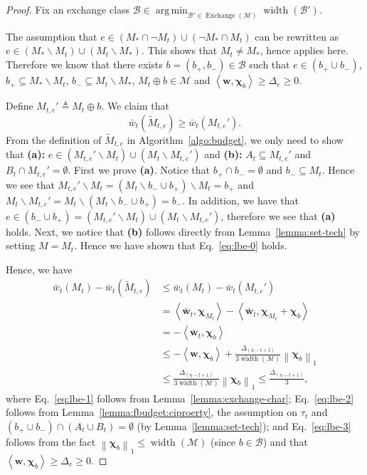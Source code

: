 \documentclass{article}
\newcommand{\M}{\mathcal M}
\newcommand{\B}{\mathcal B}
\newcommand{\del}{\backslash}
\DeclareMathOperator{\rank}{width}
\DeclareMathOperator*{\argmin}{arg\,min}
\DeclareMathOperator{\Exchange}{Exchange}
\newcommand{\inn}[1]{\left\langle #1 \right\rangle}
\newcommand{\nor}[1]{\left\|#1\right\|}
\renewcommand{\vec}[1]{\boldsymbol{#1}}
\begin{document}
\begin{proof}
Fix an exchange class $\B\in \argmin_{\B'\in \Exchange(\M)} \rank(\B')$.

The assumption that $e\in (M_*\cap \neg M_t) \cup (\neg M_* \cap M_t)$ can be rewritten as 
$e \in (M_* \del M_t) \cup (M_t\del M_*)$.
This shows that $M_t\not=M_*$,
hence  applies here. 
Therefore we know that there exists $b=(b_+,b_-)\in \B$ such that
$e\in (b_+\cup b_-)$, $b_+\subseteq M_* \del M_t$, $b_- \subseteq M_t \del M_*$, $M_t \oplus b \in \M$ and $\inn{\vec w,\vec\chi_b}\ge \Delta_e \ge 0$.

Define $M_{t,e}' \triangleq M_t \oplus b$.
We claim that
\begin{equation}
\label{eq:lbe-0}
\bar w_t(\tilde M_{t,e}) \ge \bar w_t(M_{t,e}').
\end{equation}
From the definition of $\tilde M_{t,e}$ in Algorithm~\ref{algo:budget}, we only need to show that \textbf{(a):} $e\in (M_{t,e}' \del M_t) \cup (M_t \del M_{t,e}')$ and \textbf{(b):} $A_t \subseteq M_{t,e}'$ and $B_t \cap M_{t,e}' = \emptyset$.
First we prove \textbf{(a)}. Notice that $b_+\cap b_- = \emptyset$ and $b_- \subseteq M_t$. 
Hence we see that $M_{t,e}' \del M_t = (M_t\del b_-\cup b_+) \del M_t = b_+$ and
$M_t \del M_{t,e}' = M_t \del (M_t \del b_-\cup b_+) = b_-$. 
In addition, we have that $e\in (b_-\cup b_+) = (M_{t,e}' \del M_t) \cup (M_t \del M_{t,e}')$, therefore we see that \textbf{(a)} holds. 
Next, we notice that \textbf{(b)} follows directly from Lemma~\ref{lemma:set-tech} by setting $M = M_t$.
Hence we have shown that Eq.~\eqref{eq:lbe-0} holds.

Hence, we have
\begin{align}
	\bar w_t(M_t)-\bar w_t(\tilde M_{t,e}) 
	&\le \bar w_t(M_t)-\bar w_t(M_{t,e}') \nonumber\\
	&= \inn{\vec{\bar w}_t, \vec \chi_{M_t}}-\inn{\vec{\bar w}_t, \vec \chi_{M_t}+\vec\chi_b} \label{eq:lbe-1} \\
	&= -\inn{\vec{\bar w}_t, \vec\chi_b} \nonumber\\
	&\le -\inn{\vec w, \vec\chi_b}+ \frac{\Delta_{(n-t+1)}}{3\rank(\M)}\nor{\vec\chi_b}_1 \label{eq:lbe-2}\\
	&\le \frac{\Delta_{(n-t+1)}}{3\rank(\M)}\nor{\vec\chi_b}_1 \le \frac{\Delta_{(n-t+1)}}{3}, \label{eq:lbe-3}
\end{align}
where Eq.~\eqref{eq:lbe-1} follows from Lemma~\ref{lemma:exchange-char};
Eq.~\eqref{eq:lbe-2} follows from Lemma~\ref{lemma:fbudget:ciproerty}, the assumption on $\tau_t$ and $(b_+\cup b_-) \cap (A_t \cup B_t) = \emptyset$ (by Lemma~\ref{lemma:set-tech});
and Eq.~\eqref{eq:lbe-3} follows from the fact $\nor{\vec\chi_b}_1 \le \rank(\M)$ (since $b\in \B$) and that $\inn{\vec w, \vec\chi_b} \ge \Delta_e \ge 0$.
\end{proof}
\end{document}
